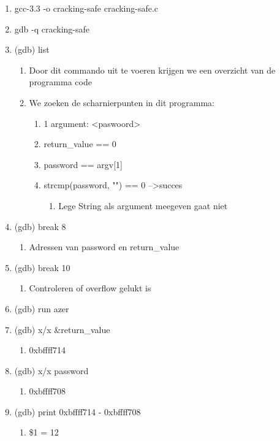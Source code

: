\begin{enumerate}
  \item gcc-3.3 -o cracking-safe cracking-safe.c
  \item gdb -q cracking-safe
  \item (gdb) list
  	\begin{enumerate}
  	\item Door dit commando uit te voeren krijgen we een overzicht van de programma code
  	\item We zoeken de scharnierpunten in dit programma:
  		\begin{enumerate}
  		\item 1 argument: \textless paswoord\textgreater
  		\item return\_value == 0
  		\item password == argv[1]
  		\item strcmp(password, "") == 0 --\textgreater succes
  			\begin{enumerate}
  			\item Lege String als argument meegeven gaat niet
  			\end{enumerate}
  		\end{enumerate}
  	\end{enumerate}
  \item (gdb) break 8
  		\begin{enumerate}
  		\item Adressen van password en return\_value  			
  		\end{enumerate}
  \item (gdb) break 10
  		\begin{enumerate}
  		\item Controleren of overflow gelukt is  			
  		\end{enumerate}
  \item (gdb) run azer
  		\item (gdb) x/x \&return\_value
  			\begin{enumerate}
  			\item 0xbffff714
  			\end{enumerate}
  		\item (gdb) x/x password
  			\begin{enumerate}
  			\item 0xbffff708
  			\end{enumerate}
  	\item (gdb) print 0xbffff714 - 0xbffff708
  		\begin{enumerate}
  		\item \$1 = 12

\end{enumerate}
\end{enumerate}
